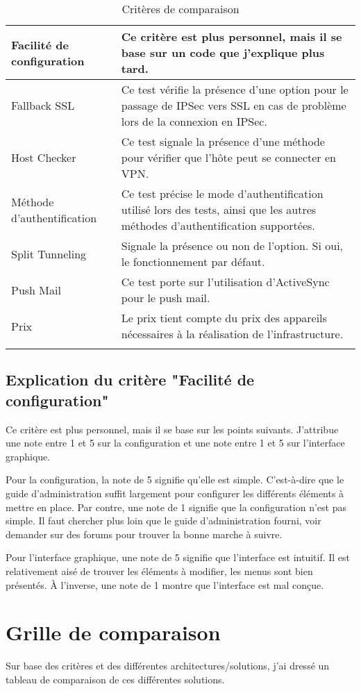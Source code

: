 \begin{longtable}{p{4cm}|p{12cm}}
    \hline
    Facilité de configuration & Ce critère est plus personnel, mais il se base sur un code que j'explique plus tard.\\
    \hline
    Fallback SSL & Ce test vérifie la présence d'une option pour le passage de IPSec vers SSL en cas de problème lors de la connexion en IPSec.\\
    \hline
    Host Checker & Ce test signale la présence d'une méthode pour vérifier que l'hôte peut se connecter en VPN.\\
    \hline
    Méthode d'authentification & Ce test précise le mode d'authentification utilisé lors des tests, ainsi que les autres méthodes d'authentification supportées.\\
    \hline
    Split Tunneling & Signale la présence ou non de l'option. Si oui, le fonctionnement par défaut.\\
    \hline
    Push Mail & Ce test porte sur l'utilisation d'ActiveSync pour le push mail.\\
    \hline
    Prix & Le prix tient compte du prix des appareils nécessaires à la réalisation de l'infrastructure.\\
    \bottomrule
    \caption{Critères de comparaison}
	\label{tab:criteres}\\
\end{longtable}

\subsection{Explication du critère "Facilité de configuration"}
Ce critère est plus personnel, mais il se base sur les points suivants.
J'attribue une note entre 1 et 5 sur la configuration et une note entre 1 et 5 sur l'interface graphique.

Pour la configuration, la note de 5 signifie qu'elle est simple.
C'est-à-dire que le guide d'administration suffit largement pour configurer les différents éléments à mettre en place.
Par contre, une note de 1 signifie que la configuration n'est pas simple.
Il faut chercher plus loin que le guide d'administration fourni, voir demander sur des forums pour trouver la bonne marche à suivre.

Pour l'interface graphique, une note de 5 signifie que l'interface est intuitif. 
Il est relativement aisé de trouver les éléments à modifier, les menus sont bien présentés.
À l'inverse, une note de 1 montre que l'interface est mal conçue.

\section{Grille de comparaison}
Sur base des critères et des différentes architectures/solutions, j'ai dressé un tableau de comparaison de ces différentes solutions.

